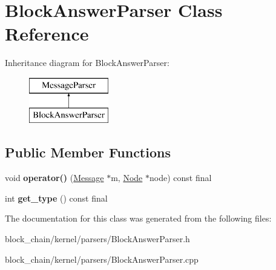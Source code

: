\hypertarget{classBlockAnswerParser}{}\section{Block\+Answer\+Parser Class Reference}
\label{classBlockAnswerParser}
Inheritance diagram for Block\+Answer\+Parser\+:\begin{figure}[H]
\begin{center}
\leavevmode
\includegraphics[height=2.000000cm]{classBlockAnswerParser}
\end{center}
\end{figure}
\subsection*{Public Member Functions}
\begin{DoxyCompactItemize}
\item 
\mbox{\label{classBlockAnswerParser_a984cd68ad8878777f86cf6ed0892dd1d}} 
void {\bfseries operator()} (\mbox{\hyperlink{classMessage}{Message}} $\ast$m, \mbox{\hyperlink{classNode}{Node}} $\ast$node) const final
\item 
\mbox{\label{classBlockAnswerParser_af29553ca77e4879f40f60a871105b6d4}} 
int {\bfseries get\+\_\+type} () const final
\end{DoxyCompactItemize}


The documentation for this class was generated from the following files\+:\begin{DoxyCompactItemize}
\item 
block\+\_\+chain/kernel/parsers/Block\+Answer\+Parser.\+h\item 
block\+\_\+chain/kernel/parsers/Block\+Answer\+Parser.\+cpp\end{DoxyCompactItemize}
